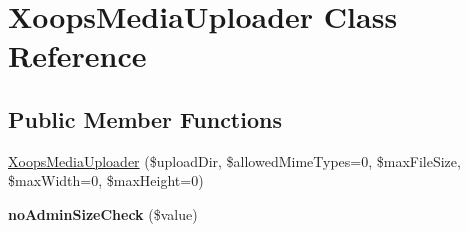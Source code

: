 \hypertarget{class_xoops_media_uploader}{\section{Xoops\-Media\-Uploader Class Reference}
\label{class_xoops_media_uploader}
}
\subsection*{Public Member Functions}
\begin{DoxyCompactItemize}
\item 
\hyperlink{class_xoops_media_uploader_a95f70e2c523540c11f111e079847612a}{Xoops\-Media\-Uploader} (\$upload\-Dir, \$allowed\-Mime\-Types=0, \$max\-File\-Size, \$max\-Width=0, \$max\-Height=0)
\item 
\hypertarget{class_xoops_media_uploader_a15fda181c4a9c00b0b47b2a2af5b4907}{{\bfseries no\-Admin\-Size\-Check} (\$value)}\label{class_xoops_media_uploader_a15fda181c4a9c00b0b47b2a2af5b4907}


\end{DoxyCompactItemize}
